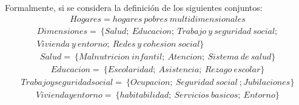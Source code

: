 \documentclass[12pt,letterpaper,spanish]{article}
\begin{document}
\begin{enumerate}
Formalmente, si se considera la definición de los siguientes conjuntos:\vspace{1em}\\
\begin{equation}
\begin{split}
Hogares= hogares\:pobres\:multidimensionales
\end{split}
\end{equation}
\begin{equation}
\begin{split}
Dimensiones=\:\{ Salud;\:Educacion;\:Trabajo\: y\: seguridad\:social;\\Vivienda\:y\:entorno;\:Redes\:y\:cohesion\:social\}
\end{split}
\end{equation}
\begin{equation}
\begin{split}
Salud=\: \{ Malnutricion\:infantil;\:Atencion;\:Sistema\:de\:salud \}
\end{split}
\end{equation}
\begin{equation}
\begin{split}
Educacion=\: \{ Escolaridad;\:Asistencia;\:Rezago\:escolar\}
\end{split}
\end{equation}
\begin{equation}
\begin{split}
Trabajo y  seguridad  social=\:\{ Ocupacion;\:Seguridad\:social\:;Jubilaciones\}
\end{split}
\end{equation}
\begin{equation}
\begin{split}
Vivienda y entorno=\:\{ habitabilidad;\:Servicios\:basicos;\:Entorno\}
\end{split}
\end{equation}
\begin{equation}
\begin{split}

\end{split}
\end{equation}
\end{enumerate}
\end{document}
